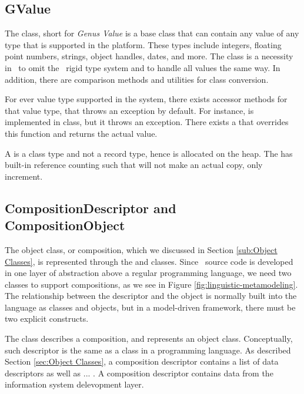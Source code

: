 \subsection{GValue}
\label{sub:GValue}
The  class, short for \textit{Genus Value} is a base class that can contain any value of any type that is supported in the platform. These types include integers, floating point numbers, strings, object handles, dates, and more. The  class is a necessity in \gap~to omit the \delphi~rigid type system and to handle all values the same way. In addition, there are comparison methods and utilities for class conversion.

For ever value type supported in the system, there exists accessor methods for that value type, that throws an exception by default. For instance,  is implemented in  class, but it throws an exception. There exists a  that overrides this function and returns the actual value.

A  is a class type and not a record type, hence is allocated on the heap. The  has built-in reference counting such that  will not make an actual copy, only increment.


\subsection{CompositionDescriptor and CompositionObject}
\label{sub:CompositionDescriptor}
The object class, or composition, which we discussed in Section \ref{sub:Object Classes}, is represented through the  and  classes. Since \gap~source code is developed in one layer of abstraction above a regular programming language, we need two classes to support compositions, as we see in Figure \ref{fig:linguistic-metamodeling}. The relationship between the descriptor and the object is normally built into the language as classes and objects, but in a model-driven framework, there must be two explicit constructs.

The  class describes a composition, and represents an object class. Conceptually, such descriptor is the same as a class in a programming language. As described Section \ref{sec:Object Classes}, a composition descriptor contains a list of data descriptors as well as ... . A composition descriptor contains data from the information system delevopment layer.

